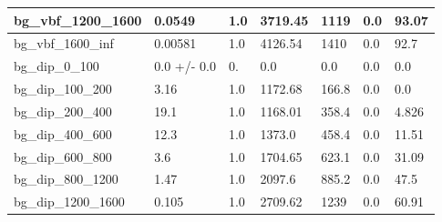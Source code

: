 \documentclass[a4paper, 10pt]{article}
\begin{document}
\begin{table}[H]
\begin{center}
\begin{tabular}{|m{23.0mm}|m{23.0mm}|m{18.0mm}|m{19.0mm}|m{19.0mm}|m{19.0mm}|m{19.0mm}|}
      \hline
      {\cellcolor{white}         bg\_vbf\_1200\_1600}& {\cellcolor{white}         0.0549}& {\cellcolor{white}         1.0}& {\cellcolor{white}         3719.45}& {\cellcolor{white}         1119}& {\cellcolor{red}         0.0}& {\cellcolor{red}         93.07}\\
      \hline
      {\cellcolor{white}         bg\_vbf\_1600\_inf}& {\cellcolor{white}         0.00581}& {\cellcolor{white}         1.0}& {\cellcolor{white}         4126.54}& {\cellcolor{white}         1410}& {\cellcolor{red}         0.0}& {\cellcolor{red}         92.7}\\
      \hline
      {\cellcolor{white}         bg\_dip\_0\_100}& {\cellcolor{white}         0.0 +/\-- 0.0}& {\cellcolor{white}         0.}& {\cellcolor{white}         0.0}& {\cellcolor{white}         0.0}& {\cellcolor{green}         0.0}& {\cellcolor{green}         0.0}\\
      \hline
      {\cellcolor{white}         bg\_dip\_100\_200}& {\cellcolor{white}         3.16}& {\cellcolor{white}         1.0}& {\cellcolor{white}         1172.68}& {\cellcolor{white}         166.8}& {\cellcolor{green}         0.0}& {\cellcolor{green}         0.0}\\
      \hline
      {\cellcolor{white}         bg\_dip\_200\_400}& {\cellcolor{white}         19.1}& {\cellcolor{white}         1.0}& {\cellcolor{white}         1168.01}& {\cellcolor{white}         358.4}& {\cellcolor{green}         0.0}& {\cellcolor{green}         4.826}\\
      \hline
      {\cellcolor{white}         bg\_dip\_400\_600}& {\cellcolor{white}         12.3}& {\cellcolor{white}         1.0}& {\cellcolor{white}         1373.0}& {\cellcolor{white}         458.4}& {\cellcolor{orange}         0.0}& {\cellcolor{orange}         11.51}\\
      \hline
      {\cellcolor{white}         bg\_dip\_600\_800}& {\cellcolor{white}         3.6}& {\cellcolor{white}         1.0}& {\cellcolor{white}         1704.65}& {\cellcolor{white}         623.1}& {\cellcolor{red}         0.0}& {\cellcolor{red}         31.09}\\
      \hline
      {\cellcolor{white}         bg\_dip\_800\_1200}& {\cellcolor{white}         1.47}& {\cellcolor{white}         1.0}& {\cellcolor{white}         2097.6}& {\cellcolor{white}         885.2}& {\cellcolor{red}         0.0}& {\cellcolor{red}         47.5}\\
      \hline
      {\cellcolor{white}         bg\_dip\_1200\_1600}& {\cellcolor{white}         0.105}& {\cellcolor{white}         1.0}& {\cellcolor{white}         2709.62}& {\cellcolor{white}         1239}& {\cellcolor{red}         0.0}& {\cellcolor{red}         60.91}\\

\end{tabular}
\end{center}
\end{table}
\end{document}
